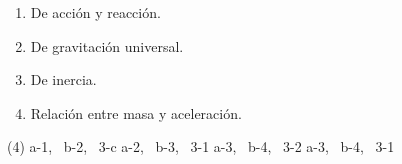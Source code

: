 \documentclass[12pt, letter]{exam}
\begin{document}
\begin{questions}
\begin{minipage}[t]{0.4\linewidth}
    \end{minipage}
    \hspace{-0.5cm}
    \begin{minipage}[t]{0.5\linewidth}
        \begin{enumerate}[label=\arabic*)]
            \itemsep0em
            \item De acción y reacción.
            \item De gravitación universal.
            \item De inercia.
            \item Relación entre masa y aceleración.
        \end{enumerate}
    \end{minipage}
    \begin{tasks}(4)
        \task a-1, \, b-2, \, 3-c
        \task a-2, \, b-3, \, 3-1
        \task a-3, \, b-4, \, 3-2
        \task a-3, \, b-4, \, 3-1
    \end{tasks}
    

\end{questions}
\end{document}
